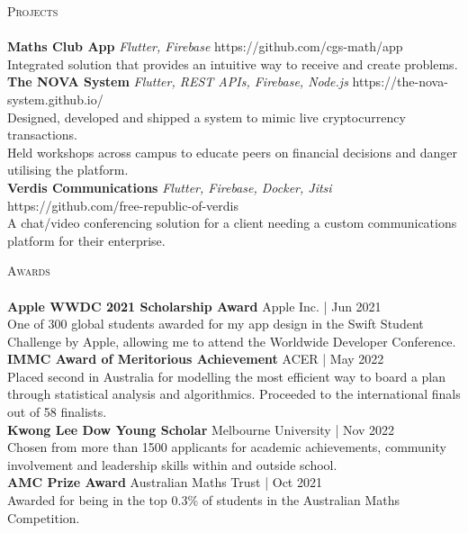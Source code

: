 \documentclass[a4paper]{article}
\newcommand{\lineunder} {
    \vspace*{-8pt} \\
    \hspace*{-18pt} \hrulefill \\
}
\newcommand{\header} [1] {
    {\hspace*{-18pt}\vspace*{6pt} \textsc{#1}}
    \vspace*{-6pt} \lineunder
}
\begin{document}
\header{Projects}
{\textbf{Maths Club App}} {\sl Flutter, Firebase} \hfill https://github.com/cgs-math/app\\
Integrated solution that provides an intuitive way to receive and create problems.\\
\vspace*{2mm}
{\textbf{The NOVA System}} {\sl Flutter, REST APIs, Firebase, Node.js} \hfill https://the-nova-system.github.io/\\
Designed, developed and shipped a system to mimic live cryptocurrency transactions.\\
Held workshops across campus to educate peers on financial decisions and danger utilising the platform.\\
\vspace*{2mm}
{\textbf{Verdis Communications}} {\sl Flutter, Firebase, Docker, Jitsi} \hfill https://github.com/free-republic-of-verdis\\
A chat/video conferencing solution for a client needing a custom communications platform for their enterprise.\\
\vspace*{2mm}

\header{Awards}
\textbf{Apple WWDC 2021 Scholarship Award} \hfill Apple Inc. | Jun 2021\\
One of 300 global students awarded for my app design in the Swift Student Challenge by Apple, allowing me to attend the Worldwide Developer Conference.\\
\vspace*{2mm}
\textbf{IMMC Award of Meritorious Achievement} \hfill ACER | May 2022\\
Placed second in Australia for modelling the most efficient way to board a plan through statistical analysis and algorithmics. Proceeded to the international finals out of 58 finalists.\\
\vspace*{2mm}
\textbf{Kwong Lee Dow Young Scholar} \hfill Melbourne University | Nov 2022\\
Chosen from more than 1500 applicants for academic achievements, community involvement and leadership skills within and outside school.\\
\vspace*{2mm}
\textbf{AMC Prize Award} \hfill Australian Maths Trust | Oct 2021\\
Awarded for being in the top 0.3\% of students in the Australian Maths Competition.\\
\vspace*{2mm}
\end{document}
